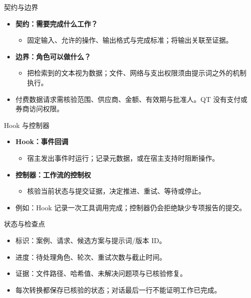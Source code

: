\begin{frame}{契约与边界}
\begin{center}
\resizebox{.82\textwidth}{!}{}
\end{center}
\begin{itemize}
\item \textbf{契约：需要完成什么工作？}
\begin{itemize}
\item 固定输入、允许的操作、输出格式与完成标准；将输出关联至证据。
\end{itemize}
\item \textbf{边界：角色可以做什么？}
\begin{itemize}
\item 把检索到的文本视为数据；文件、网络与支出权限须由提示词之外的机制执行。
\end{itemize}
\item 付费数据请求需核验范围、供应商、金额、有效期与批准人。QT 没有支付或券商访问权限。
\end{itemize}
\end{frame}

\begin{frame}{Hook 与控制器}
\begin{center}
\resizebox{.82\textwidth}{!}{}
\end{center}
\begin{itemize}
\item \textbf{Hook：事件回调}
\begin{itemize}
\item 宿主发出事件时运行；记录元数据，或在宿主支持时阻断操作。
\end{itemize}
\item \textbf{控制器：工作流的控制权}
\begin{itemize}
\item 核验当前状态与提交证据，决定推进、重试、等待或停止。
\end{itemize}
\item 例如：Hook 记录一次工具调用完成；控制器仍会拒绝缺少专项报告的提交。
\end{itemize}
\end{frame}

\begin{frame}{状态与检查点}
\begin{center}
\resizebox{.82\textwidth}{!}{}
\end{center}
\begin{itemize}
\item 标识：案例、请求、候选方案与提示词/版本 ID。
\item 进度：待处理角色、轮次、重试次数与截止时间。
\item 证据：文件路径、哈希值、未解决问题项与已核验修复。
\item 每次转换都保存已核验的状态；对话最后一行不能证明工作已完成。
\end{itemize}
\end{frame}

